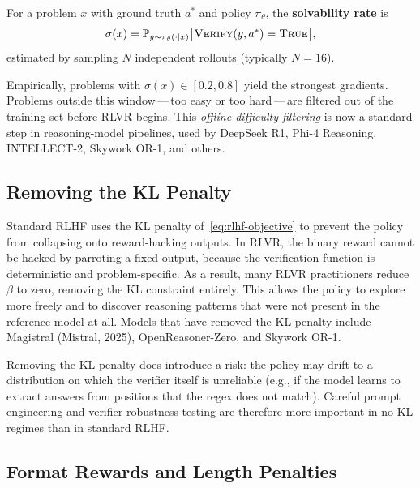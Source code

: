 \begin{definition}
\label{def:solvability}
For a problem $x$ with ground truth $a^*$ and policy $\pi_\theta$,
the \textbf{solvability rate} is
\[
\sigma(x) = \mathbb{P}_{y \sim \pi_\theta(\cdot|x)}
            \bigl[\textsc{Verify}(y, a^*) = \textsc{True}\bigr],
\]
estimated by sampling $N$ independent rollouts (typically $N = 16$).
\end{definition}

Empirically, problems with $\sigma(x) \in [0.2, 0.8]$ yield the
strongest gradients. Problems outside this window\,---\,too easy or
too hard\,---\,are filtered out of the training set before RLVR
begins. This \emph{offline difficulty filtering} is now a standard
step in reasoning-model pipelines, used by DeepSeek R1, Phi-4
Reasoning, INTELLECT-2, Skywork OR-1, and others.

\subsection{Removing the KL Penalty}
\label{subsec:no-kl}

Standard RLHF uses the KL penalty of~\eqref{eq:rlhf-objective} to
prevent the policy from collapsing onto reward-hacking outputs. In
RLVR, the binary reward cannot be hacked by parroting a fixed output,
because the verification function is deterministic and problem-specific.
As a result, many RLVR practitioners reduce $\beta$ to zero, removing
the KL constraint entirely. This allows the policy to explore more
freely and to discover reasoning patterns that were not present in
the reference model at all. Models that have removed the KL penalty
include Magistral (Mistral, 2025), OpenReasoner-Zero, and Skywork OR-1.

\begin{remark}
Removing the KL penalty does introduce a risk: the policy may drift
to a distribution on which the verifier itself is unreliable (e.g.,
if the model learns to extract answers from positions that the regex
does not match). Careful prompt engineering and verifier robustness
testing are therefore more important in no-KL regimes than in
standard RLHF.
\end{remark}

\subsection{Format Rewards and Length Penalties}
\label{subsec:format-rewards}


